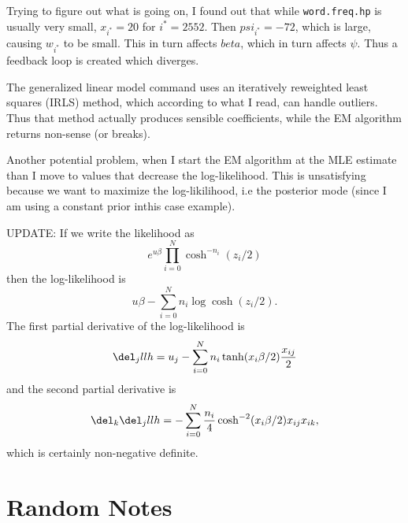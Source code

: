 \documentclass[]{article}
\begin{document}
Trying to figure out what is going on, I found out that while
\texttt{word.freq.hp} is usually very small, $x_{i^*} = 20$ for $i^*=2552$.
Then $psi_{i^*} = -72$, which is large, causing $w_{i^*}$ to be small.  This in
turn affects $beta$, which in turn affects $\psi$.  Thus a feedback loop is
created which diverges.

The generalized linear model command uses an iteratively reweighted least
squares (IRLS) method, which according to what I read, can handle outliers.
Thus that method actually produces sensible coefficients, while the EM algorithm
returns non-sense (or breaks).

Another potential problem, when I start the EM algorithm at the MLE estimate
than I move to values that decrease the log-likelihood.  This is unsatisfying
because we want to maximize the log-likilihood, i.e the posterior mode (since I
am using a constant prior inthis case example).

UPDATE: If we write the likelihood as
\[
e^{u\beta} \prod_{i=0}^N \cosh^{-n_i}(z_i/2)
\]
then the log-likelihood is
\[
u \beta - \sum_{i=0}^N n_i \log \cosh (z_i/2).
\]
The first partial derivative of the log-likelihood is
\[
\del_j llh = u_j - \sum_{i=0}^N n_i \tanh(x_i \beta/2) \frac{x_{ij}}{2}
\]
and the second partial derivative is
\[
\del_k \del_j llh = - \sum_{i=0}^N \frac{n_i}{4} \cosh^{-2}(x_i \beta/2) x_{ij} x_{ik},
\]
which is certainly non-negative definite.

\section{Random Notes}
\end{document}
